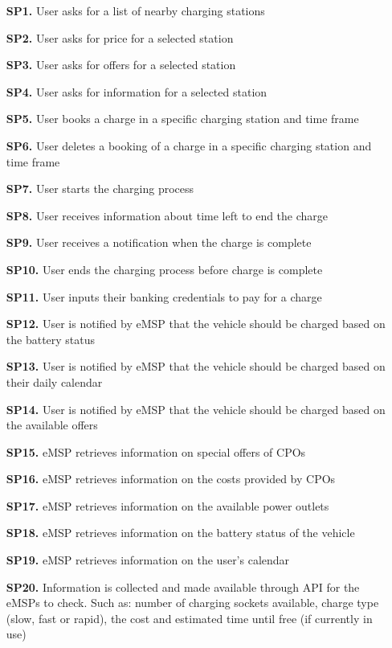\documentclass[12pt]{report}
\begin{document}
\begin{itemize}
    \item[\textbf{SP1.}]User asks for a list of nearby charging stations
    \item[\textbf{SP2.}]User asks for price for a selected station
    \item[\textbf{SP3.}]User asks for offers for a selected station
    \item[\textbf{SP4.}]User asks for information for a selected station
    \item[\textbf{SP5.}]User books a charge in a specific charging station and time frame
    \item[\textbf{SP6.}]User deletes a booking of a charge in a specific charging station and time frame
    \item[\textbf{SP7.}]User starts the charging process
    \item[\textbf{SP8.}]User receives information about time left to end the charge
    \item[\textbf{SP9.}]User receives a notification when the charge is complete
    \item[\textbf{SP10.}]User ends the charging process before charge is complete
    \item[\textbf{SP11.}]User inputs their banking credentials to pay for a charge
    \item[\textbf{SP12.}]User is notified by eMSP that the vehicle should be charged based on the battery status
    \item[\textbf{SP13.}]User is notified by eMSP that the vehicle should be charged based on their daily calendar 
    \item[\textbf{SP14.}]User is notified by eMSP that the vehicle should be charged based on the available offers
    \item[\textbf{SP15.}]eMSP retrieves information on special offers of CPOs
    \item[\textbf{SP16.}]eMSP retrieves information on the costs provided by CPOs
    \item[\textbf{SP17.}]eMSP retrieves information on the available power outlets 
    \item[\textbf{SP18.}]eMSP retrieves information on the battery status of the vehicle
    \item[\textbf{SP19.}]eMSP retrieves information on the user’s calendar
    \item[\textbf{SP20.}]Information is collected and made available through API for the eMSPs to check. Such as: number of charging sockets available, charge type (slow, fast or rapid), the cost and estimated time until free (if currently in use)

\end{itemize}
\end{document}
